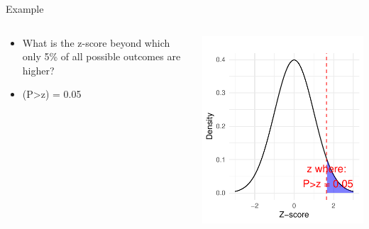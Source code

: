 \documentclass[
  ignorenonframetext,
]{beamer}
\providecommand{\tightlist}{%
  \setlength{\itemsep}{0pt}\setlength{\parskip}{0pt}}
\begin{document}
\begin{frame}{Example}
\label{example-3}
\begin{columns}[T]
\begin{column}{0.5\textwidth}
\vspace{1.5cm}

\begin{itemize}
\tightlist
\item
  What is the z-score beyond which only 5\% of all possible outcomes are
  higher?
\end{itemize}

\begin{itemize}
\tightlist
\item
  (P\textgreater z) = 0.05
\end{itemize}
\end{column}

\begin{column}{0.5\textwidth}
\vspace{1cm}

\includegraphics{M5-Hypothesis-Testing,-Probability-and-Distribution_files/figure-beamer/unnamed-chunk-18-1.pdf}
\end{column}
\end{columns}
\end{frame}
\end{document}
